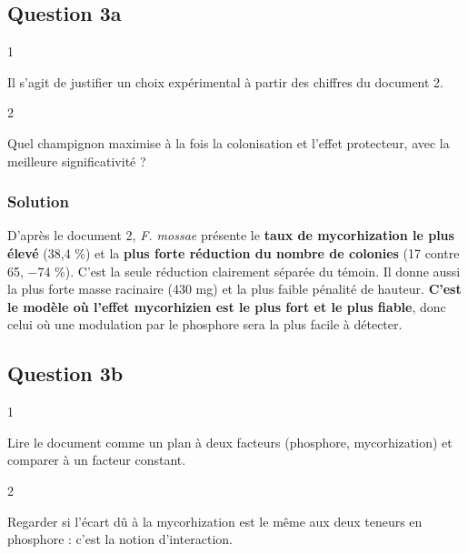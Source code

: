 \documentclass[11pt,a4paper]{article}
\begin{document}
\hypertarget{question-3a}{%
\subsection{Question 3a}\label{question-3a}}

\begin{indication}{1}

Il s'agit de justifier un choix expérimental à partir des chiffres du document 2.

\end{indication}

\begin{indication}{2}

Quel champignon maximise à la fois la colonisation et l'effet protecteur, avec la meilleure significativité ?

\end{indication}

\hypertarget{solution-6}{%
\subsubsection{Solution}\label{solution-6}}

D'après le document 2, \emph{F. mossae} présente le \textbf{taux de mycorhization le plus élevé} (38,4 \%) et la \textbf{plus forte réduction du nombre de colonies} (17 contre 65, −74 \%). C'est la seule réduction clairement séparée du témoin. Il donne aussi la plus forte masse racinaire (430 mg) et la plus faible pénalité de hauteur. \textbf{C'est le modèle où l'effet mycorhizien est le plus fort et le plus fiable}, donc celui où une modulation par le phosphore sera la plus facile à détecter.

\hypertarget{question-3b}{%
\subsection{Question 3b}\label{question-3b}}

\begin{indication}{1}

Lire le document comme un plan à deux facteurs (phosphore, mycorhization) et comparer à un facteur constant.

\end{indication}

\begin{indication}{2}

Regarder si l'écart dû à la mycorhization est le même aux deux teneurs en phosphore : c'est la notion d'interaction.

\end{indication}
\end{document}
